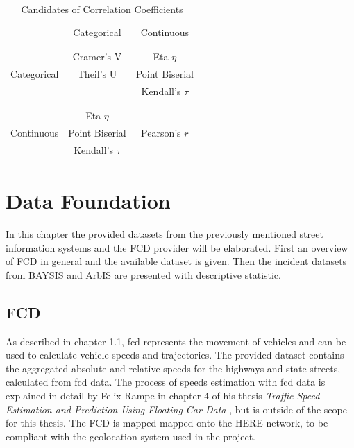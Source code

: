 \documentclass[a4paper,12pt]{report}
\begin{document}
\begin{table}[ht]
	\centering
	\begin{tabular}{c|c|c}
					& Categorical 		& Continuous\\
		\\[-1em]
		\hline
		\\[-1em]
		 			& Cramer’s V  	& Eta $\eta$	\\
		Categorical	& Theil’s U		& Point Biserial\\
					& 				& Kendall's $\tau$\\
		\\[-1em]
		\hline
		\\[-1em]
					& Eta $\eta$		  			& \\
		Continuous	& Point Biserial		& Pearson's $r$\\
				& Kendall's $\tau$		& \\
	\end{tabular}
	\caption{\label{tab:table-name}Candidates of Correlation Coefficients}
\end{table}

	
\chapter{Data Foundation}
\label{data}
In this chapter the provided datasets from the previously mentioned street information systems and the FCD provider will be elaborated. First an overview of FCD in general and the available dataset is given. Then the incident datasets from BAYSIS and ArbIS are presented with descriptive statistic.

\section{FCD}
\label{dataset_fcd}
 
As described in chapter 1.1, \acrshort{fcd} represents the movement of vehicles and can be used to calculate vehicle speeds and trajectories. The provided dataset contains the aggregated absolute and relative speeds for the highways and state streets, calculated from \acrshort{fcd} data. The process of speeds estimation with \acrshort{fcd} data is explained in detail by Felix Rampe in chapter 4 of his thesis \textit{Traffic Speed Estimation and Prediction Using Floating Car Data} \cite{Rempe2018}, but is outside of the scope for this thesis. The FCD is mapped mapped onto the HERE \cite{HERE2020} network, to be compliant with the geolocation system used in the project.
\end{document}
